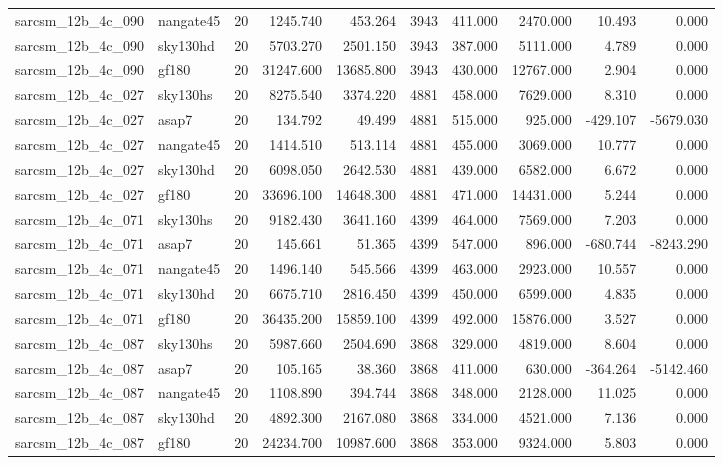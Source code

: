 \begin{longtable}{llrrrrrrrr}
sarcsm\_12b\_4c\_090 & nangate45 & 20 & 1245.740 & 453.264 & 3943 & 411.000 & 2470.000 & 10.493 & 0.000 \\
sarcsm\_12b\_4c\_090 & sky130hd & 20 & 5703.270 & 2501.150 & 3943 & 387.000 & 5111.000 & 4.789 & 0.000 \\
sarcsm\_12b\_4c\_090 & gf180 & 20 & 31247.600 & 13685.800 & 3943 & 430.000 & 12767.000 & 2.904 & 0.000 \\
sarcsm\_12b\_4c\_027 & sky130hs & 20 & 8275.540 & 3374.220 & 4881 & 458.000 & 7629.000 & 8.310 & 0.000 \\
sarcsm\_12b\_4c\_027 & asap7 & 20 & 134.792 & 49.499 & 4881 & 515.000 & 925.000 & -429.107 & -5679.030 \\
sarcsm\_12b\_4c\_027 & nangate45 & 20 & 1414.510 & 513.114 & 4881 & 455.000 & 3069.000 & 10.777 & 0.000 \\
sarcsm\_12b\_4c\_027 & sky130hd & 20 & 6098.050 & 2642.530 & 4881 & 439.000 & 6582.000 & 6.672 & 0.000 \\
sarcsm\_12b\_4c\_027 & gf180 & 20 & 33696.100 & 14648.300 & 4881 & 471.000 & 14431.000 & 5.244 & 0.000 \\
sarcsm\_12b\_4c\_071 & sky130hs & 20 & 9182.430 & 3641.160 & 4399 & 464.000 & 7569.000 & 7.203 & 0.000 \\
sarcsm\_12b\_4c\_071 & asap7 & 20 & 145.661 & 51.365 & 4399 & 547.000 & 896.000 & -680.744 & -8243.290 \\
sarcsm\_12b\_4c\_071 & nangate45 & 20 & 1496.140 & 545.566 & 4399 & 463.000 & 2923.000 & 10.557 & 0.000 \\
sarcsm\_12b\_4c\_071 & sky130hd & 20 & 6675.710 & 2816.450 & 4399 & 450.000 & 6599.000 & 4.835 & 0.000 \\
sarcsm\_12b\_4c\_071 & gf180 & 20 & 36435.200 & 15859.100 & 4399 & 492.000 & 15876.000 & 3.527 & 0.000 \\
sarcsm\_12b\_4c\_087 & sky130hs & 20 & 5987.660 & 2504.690 & 3868 & 329.000 & 4819.000 & 8.604 & 0.000 \\
sarcsm\_12b\_4c\_087 & asap7 & 20 & 105.165 & 38.360 & 3868 & 411.000 & 630.000 & -364.264 & -5142.460 \\
sarcsm\_12b\_4c\_087 & nangate45 & 20 & 1108.890 & 394.744 & 3868 & 348.000 & 2128.000 & 11.025 & 0.000 \\
sarcsm\_12b\_4c\_087 & sky130hd & 20 & 4892.300 & 2167.080 & 3868 & 334.000 & 4521.000 & 7.136 & 0.000 \\
sarcsm\_12b\_4c\_087 & gf180 & 20 & 24234.700 & 10987.600 & 3868 & 353.000 & 9324.000 & 5.803 & 0.000 \\

\end{longtable}
